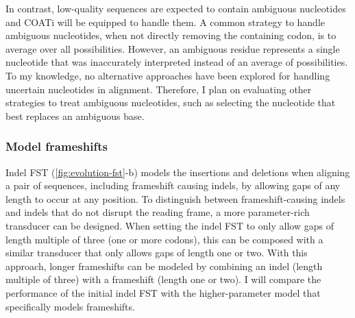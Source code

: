 In contrast, low-quality sequences are expected to contain ambiguous nucleotides
and COATi will be equipped to handle them.
A common strategy to handle ambiguous nucleotides, when not directly removing the
containing codon, is to average over all possibilities.
However, an ambiguous residue represents a single nucleotide that was
inaccurately interpreted instead of an average of possibilities.
To my knowledge, no alternative approaches have been explored for handling
uncertain nucleotides in alignment.
Therefore, I plan on evaluating other strategies to treat ambiguous nucleotides,
such as selecting the nucleotide that best replaces an ambiguous base.

\subsubsection{Model frameshifts}



Indel FST (\ref{fig:evolution-fst}-b) models the insertions and deletions when
aligning a pair of sequences, including frameshift causing indels, by allowing
gaps of any length to occur at any position.
To distinguish between frameshift-causing indels and indels that do not disrupt
the reading frame, a more parameter-rich transducer can be designed.
When setting the indel FST to only allow gaps of length multiple of three (one
or more codons), this can be composed with a similar transducer that only
allows gaps of length one or two.
With this approach, longer frameshifts can be modeled by combining an indel
(length multiple of three) with a frameshift (length one or two).
I will compare the performance of the initial indel FST with the
higher-parameter model that specifically models frameshifts.

